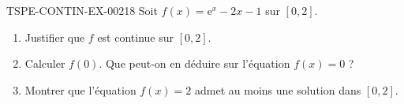 \begin{exercice}{TSPE-CONTIN-EX-002}{1}{8}
Soit $f(x) = \mathrm{e}^x - 2x - 1$ sur $[0, 2]$.
\begin{enumerate}
  \item Justifier que $f$ est continue sur $[0, 2]$.
  \item Calculer $f(0)$. Que peut-on en déduire sur l'équation $f(x) = 0$ ?
  \item Montrer que l'équation $f(x) = 2$ admet au moins une solution dans $[0, 2]$.
\end{enumerate}
\end{exercice}
